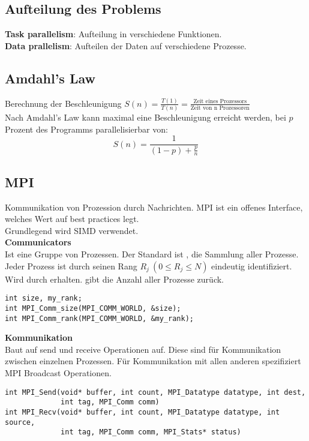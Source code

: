\subsection{Aufteilung des Problems}
\textbf{Task parallelism}: Aufteilung in verschiedene Funktionen.\\
\textbf{Data prallelism}: Aufteilen der Daten auf verschiedene Prozesse.\\


\subsection{Amdahl's Law}
Berechnung der Beschleunigung \(S(n) = \frac{T(1)}{T(n)} = \frac{\text{Zeit eines Prozessors}}{\text{Zeit von n Prozessoren}}\)\\
Nach Amdahl's Law kann maximal eine Beschleunigung erreicht werden, bei \(p\) Prozent des Programms parallelisierbar von:
\[S(n) = \frac{1}{(1-p) + \frac{p}{n}}\]

\subsection{MPI}
Kommunikation von Prozession durch Nachrichten.
MPI ist ein offenes Interface, welches Wert auf best practices legt.\\
Grundlegend wird SIMD verwendet.\\

\textbf{Communicators}\\
Ist eine Gruppe von Prozessen. Der Standard ist , die Sammlung aller Prozesse.\\
Jeder Prozess ist durch seinen Rang \(R_j\ (0 \leq R_j \leq N) \) eindeutig identifiziert. Wird durch  erhalten.
 gibt die Anzahl aller Prozesse zurück.
\begin{lstlisting}
int size, my_rank;
int MPI_Comm_size(MPI_COMM_WORLD, &size);
int MPI_Comm_rank(MPI_COMM_WORLD, &my_rank);
\end{lstlisting}

\textbf{Kommunikation}\\
Baut auf send und receive Operationen auf. Diese sind für Kommunikation zwischen einzelnen Prozessen.
Für Kommunikation mit allen anderen spezifiziert MPI Broadcast Operationen.
\begin{lstlisting}
int MPI_Send(void* buffer, int count, MPI_Datatype datatype, int dest,
             int tag, MPI_Comm comm)
int MPI_Recv(void* buffer, int count, MPI_Datatype datatype, int source,
             int tag, MPI_Comm comm, MPI_Stats* status)
\end{lstlisting}

